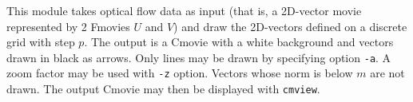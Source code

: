 This module takes optical flow data as input (that is, a 2D-vector 
movie represented by 2 Fmovies $U$ and $V$) and draw the 2D-vectors defined
on a discrete grid with step $p$. The output is a
Cmovie with a white background and vectors drawn in black as arrows.
Only lines may be drawn by specifying option \verb+-a+. 
A zoom factor may be used with \verb+-z+ option.
Vectors whose norm is below $m$ are not drawn.
The output Cmovie may then be displayed with \verb+cmview+.